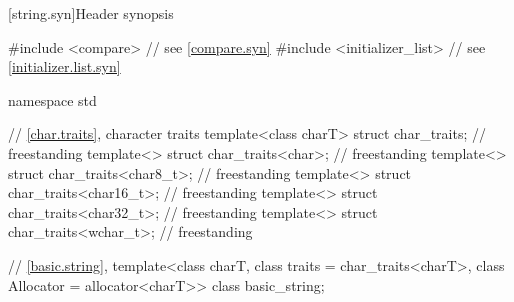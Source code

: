 [string.syn]{Header  synopsis}
%

\begin{codeblock}
#include <compare>              // see \ref{compare.syn}
#include <initializer_list>     // see \ref{initializer.list.syn}

namespace std {
  // \ref{char.traits}, character traits
  template<class charT> struct char_traits;                             // freestanding
  template<> struct char_traits<char>;                                  // freestanding
  template<> struct char_traits<char8_t>;                               // freestanding
  template<> struct char_traits<char16_t>;                              // freestanding
  template<> struct char_traits<char32_t>;                              // freestanding
  template<> struct char_traits<wchar_t>;                               // freestanding

  // \ref{basic.string}, 
  template<class charT, class traits = char_traits<charT>, class Allocator = allocator<charT>>
    class basic_string;

}
\end{codeblock}
